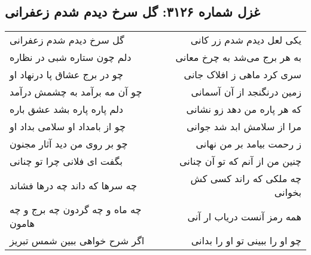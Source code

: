 \begin{center}
\section*{غزل شماره ۳۱۲۶: گل سرخ دیدم شدم زعفرانی}
\label{sec:3126}
\begin{longtable}{l p{0.5cm} r}
گل سرخ دیدم شدم زعفرانی
&&
یکی لعل دیدم شدم زر کانی
\\
دلم چون ستاره شبی در نظاره
&&
به هر برج می‌شد به چرخ معانی
\\
چو در برج عشاق پا درنهاد او
&&
سری کرد ماهی ز افلاک جانی
\\
چو آن مه برآمد به چشمش درآمد
&&
زمین درنگنجد از آن آسمانی
\\
دلم پاره پاره بشد عشق باره
&&
که هر پاره من دهد زو نشانی
\\
چو از بامداد او سلامی بداد او
&&
مرا از سلامش ابد شد جوانی
\\
چو بر روی من دید آثار مجنون
&&
ز رحمت بیامد بر من نهانی
\\
بگفت ای فلانی چرا تو چنانی
&&
چنین من از آنم که تو آن چنانی
\\
چه سرها که داند چه درها فشاند
&&
چه ملکی که راند کسی کش بخوانی
\\
چه ماه و چه گردون چه برج و چه هامون
&&
همه رمز آنست دریاب ار آنی
\\
اگر شرح خواهی ببین شمس تبریز
&&
چو او را ببینی تو او را بدانی
\\
\end{longtable}
\end{center}
